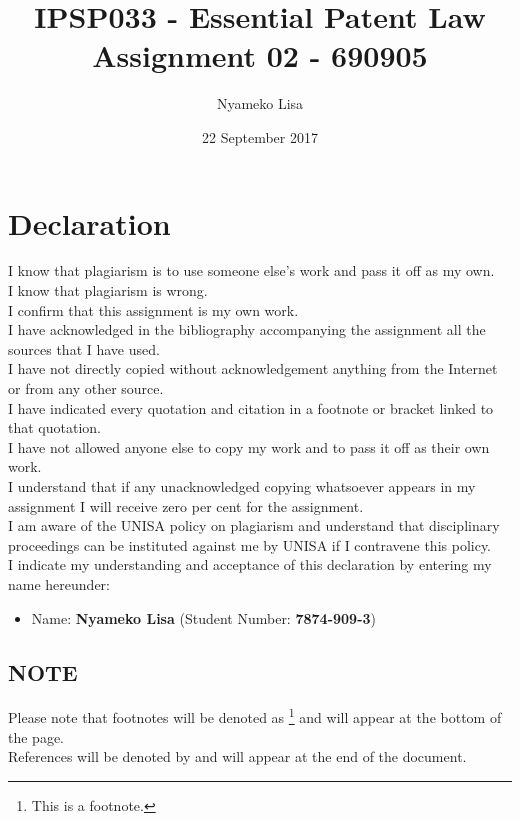 \documentclass[11pt]{article}
\author{Nyameko Lisa}
\date{22 September 2017}
\title{IPSP033 - Essential Patent Law\\\medskip
\large Assignment 02 - 690905}
\begin{document}
\maketitle
\addvspace{110pt}

\justifying
\addvspace{110pt}
\section*{Declaration}
\label{sec:orgc5b28b9}
I know that plagiarism is to use someone else’s work and pass it off as my own.\\
I know that plagiarism is wrong.\\
I confirm that this assignment is my own work.\\
I have acknowledged in the bibliography accompanying the assignment all the sources that I have used.\\
I have not directly copied without acknowledgement anything from the Internet or from any other source.\\
I have indicated every quotation and citation in a footnote or bracket linked to that quotation.\\
I have not allowed anyone else to copy my work and to pass it off as their own work.\\
I understand that if any unacknowledged copying whatsoever appears in my assignment I will receive zero per cent for the assignment.\\
I am aware of the UNISA policy on plagiarism and understand that disciplinary proceedings can be instituted against me by UNISA if I contravene this policy.\\
I indicate my understanding and acceptance of this declaration by
entering my name hereunder:
\begin{itemize}
\item Name: \textbf{Nyameko Lisa} (Student Number: \textbf{7874-909-3})
\end{itemize}

\subsection*{NOTE}
\label{sec:org0e7f5aa}
Please note that footnotes will be denoted as \footnote{This is a footnote.} and will
appear at the bottom of the page.\\
References will be denoted by \cite{rsa78_patents_act} and will appear at the end of the document.
\newpage
\end{document}
